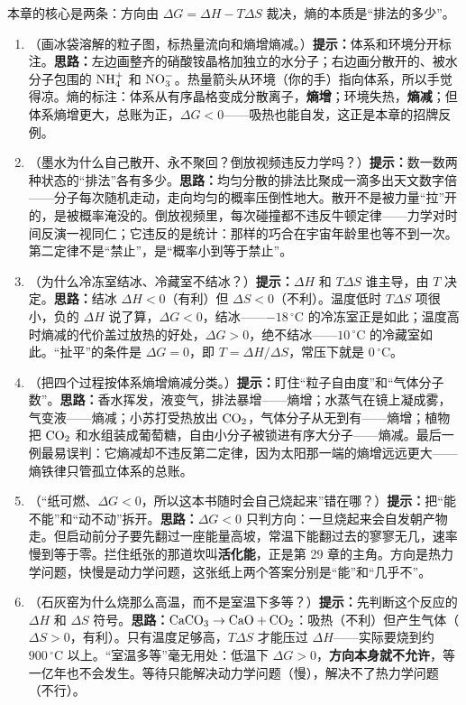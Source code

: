 本章的核心是两条：方向由 $\Delta G = \Delta H - T\Delta S$ 裁决，熵的本质是“排法的多少”。

\begin{enumerate}[itemsep=3pt]
\item （画冰袋溶解的粒子图，标热量流向和熵增熵减。）\textbf{提示：}体系和环境分开标注。\textbf{思路：}左边画整齐的硝酸铵晶格加独立的水分子；右边画分散开的、被水分子包围的 $\mathrm{NH_4^+}$ 和 $\mathrm{NO_3^-}$。热量箭头从环境（你的手）指向体系，所以手觉得凉。熵的标注：体系从有序晶格变成分散离子，\textbf{熵增}；环境失热，\textbf{熵减}；但体系熵增更大，总账为正，$\Delta G<0$——吸热也能自发，这正是本章的招牌反例。
\item （墨水为什么自己散开、永不聚回？倒放视频违反力学吗？）\textbf{提示：}数一数两种状态的“排法”各有多少。\textbf{思路：}均匀分散的排法比聚成一滴多出天文数字倍——分子每次随机走动，走向均匀的概率压倒性地大。散开不是被力量“拉”开的，是被概率淹没的。倒放视频里，每次碰撞都不违反牛顿定律——力学对时间反演一视同仁；它违反的是统计：那样的巧合在宇宙年龄里也等不到一次。第二定律不是“禁止”，是“概率小到等于禁止”。
\item （为什么冷冻室结冰、冷藏室不结冰？）\textbf{提示：}$\Delta H$ 和 $T\Delta S$ 谁主导，由 $T$ 决定。\textbf{思路：}结冰 $\Delta H<0$（有利）但 $\Delta S<0$（不利）。温度低时 $T\Delta S$ 项很小，负的 $\Delta H$ 说了算，$\Delta G<0$，结冰——$-18\,^{\circ}\mathrm{C}$ 的冷冻室正是如此；温度高时熵减的代价盖过放热的好处，$\Delta G>0$，绝不结冰——$10\,^{\circ}\mathrm{C}$ 的冷藏室如此。“扯平”的条件是 $\Delta G = 0$，即 $T = \Delta H / \Delta S$，常压下就是 $0\,^{\circ}\mathrm{C}$。
\item （把四个过程按体系熵增熵减分类。）\textbf{提示：}盯住“粒子自由度”和“气体分子数”。\textbf{思路：}香水挥发，液变气，排法暴增——熵增；水蒸气在镜上凝成雾，气变液——熵减；小苏打受热放出 $\mathrm{CO_2}$，气体分子从无到有——熵增；植物把 $\mathrm{CO_2}$ 和水组装成葡萄糖，自由小分子被锁进有序大分子——熵减。最后一例最易误判：它熵减却不违反第二定律，因为太阳那一端的熵增远远更大——熵铁律只管孤立体系的总账。
\item （“纸可燃、$\Delta G<0$，所以这本书随时会自己烧起来”错在哪？）\textbf{提示：}把“能不能”和“动不动”拆开。\textbf{思路：}$\Delta G<0$ 只判方向：一旦烧起来会自发朝产物走。但启动前分子要先翻过一座能量高坡，常温下能翻过去的寥寥无几，速率慢到等于零。拦住纸张的那道坎叫\textbf{活化能}，正是第 29 章的主角。方向是热力学问题，快慢是动力学问题，这张纸上两个答案分别是“能”和“几乎不”。
\item （石灰窑为什么烧那么高温，而不是室温下多等？）\textbf{提示：}先判断这个反应的 $\Delta H$ 和 $\Delta S$ 符号。\textbf{思路：}$\mathrm{CaCO_3} \rightarrow \mathrm{CaO} + \mathrm{CO_2}$：吸热（不利）但产生气体（$\Delta S>0$，有利）。只有温度足够高，$T\Delta S$ 才能压过 $\Delta H$——实际要烧到约 $900\,^{\circ}\mathrm{C}$ 以上。“室温多等”毫无用处：低温下 $\Delta G>0$，\textbf{方向本身就不允许}，等一亿年也不会发生。等待只能解决动力学问题（慢），解决不了热力学问题（不行）。
\end{enumerate}

